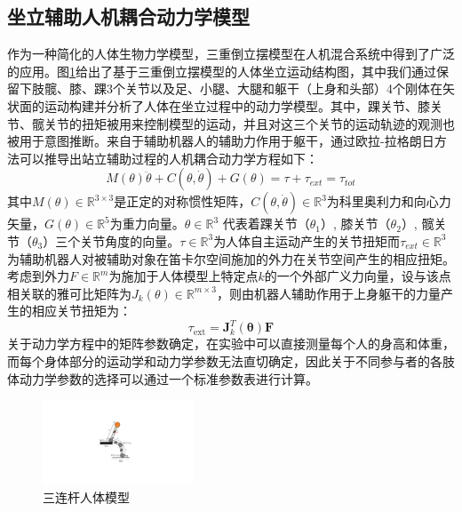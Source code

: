 \subsection{坐立辅助人机耦合动力学模型}  
作为一种简化的人体生物力学模型，三重倒立摆模型在人机混合系统中得到了广泛的应用。图\ref{fig:4-1}给出了基于三重倒立摆模型的人体坐立运动结构图，其中我们通过保留下肢髋、膝、踝3个关节以及足、小腿、大腿和躯干（上身和头部）4个刚体在矢状面的运动构建并分析了人体在坐立过程中的动力学模型。其中，踝关节、膝关节、髋关节的扭矩被用来控制模型的运动，并且对这三个关节的运动轨迹的观测也被用于意图推断。来自于辅助机器人的辅助力作用于躯干，通过欧拉-拉格朗日方法可以推导出站立辅助过程的人机耦合动力学方程如下：
\begin{equation}
    M(\theta) \ddot{\theta}+C(\theta, \dot{\theta})+G(\theta)=\tau+\tau_{e x t}=\tau_{tot}
    \label{eq:4-1}
\end{equation}
其中$M(\theta)\in \mathbb{R}^{3\times 3}$是正定的对称惯性矩阵，$C(\theta, \dot{\theta})\in \mathbb{R}^3$为科里奥利力和向心力矢量，$G(\theta)\in \mathbb{R}^5$为重力向量。$\theta \in \mathbb{R}^3$ 代表着踝关节（$\theta_1$）, 膝关节（$\theta_2$）, 髋关节（$\theta_3$）三个关节角度的向量。$\tau \in \mathbb{R}^3$为人体自主运动产生的关节扭矩而$\tau_{ext} \in \mathbb{R}^3$为辅助机器人对被辅助对象在笛卡尔空间施加的外力在关节空间产生的相应扭矩。考虑到外力$F\in \mathbb{R}^m$为施加于人体模型上特定点$k$的一个外部广义力向量，设与该点相关联的雅可比矩阵为$J_k(\theta)\in \mathbb{R}^{m\times 3}$，则由机器人辅助作用于上身躯干的力量产生的相应关节扭矩为：
\begin{equation}
    \tau_{\text {ext}}=\boldsymbol{J}_k^T(\boldsymbol{\theta}) \boldsymbol{F}
    \label{eq:4-2}
\end{equation}
关于动力学方程中的矩阵参数确定，在实验中可以直接测量每个人的身高和体重，而每个身体部分的运动学和动力学参数无法直切确定，因此关于不同参与者的各肢体动力学参数的选择可以通过一个标准参数表进行计算\cite{tozerenHumanBodyDynamics2000}。

\begin{figure}[htb]
    \centering\includegraphics[width=0.4\textwidth]{figures/4-Fig-1.pdf}
    \caption{三连杆人体模型}
    \label{fig:4-1}
\end{figure}
